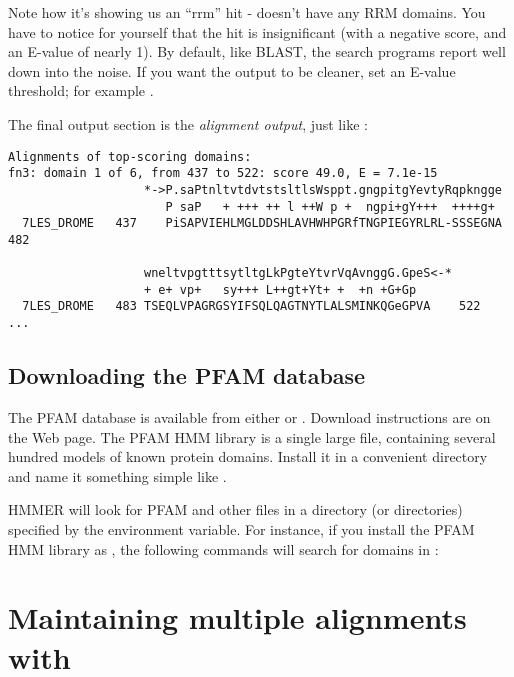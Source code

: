 Note how it's showing us an ``rrm'' hit -  doesn't
have any RRM domains. You have to notice for yourself that the hit is
insignificant (with a negative score, and an E-value of nearly 1).  By
default, like BLAST, the search programs report well down into the
noise. If you want the output to be cleaner, set an E-value threshold;
for example .

The final output section is the {\em alignment output}, just like :

{\small\begin{verbatim}
Alignments of top-scoring domains:
fn3: domain 1 of 6, from 437 to 522: score 49.0, E = 7.1e-15
                   *->P.saPtnltvtdvtstsltlsWsppt.gngpitgYevtyRqpkngge
                      P saP   + +++ ++ l ++W p +  ngpi+gY+++  ++++g+ 
  7LES_DROME   437    PiSAPVIEHLMGLDDSHLAVHWHPGRfTNGPIEGYRLRL-SSSEGNA 482  

                   wneltvpgtttsytltgLkPgteYtvrVqAvnggG.GpeS<-*
                   + e+ vp+   sy+++ L++gt+Yt+ +  +n +G+Gp     
  7LES_DROME   483 TSEQLVPAGRGSYIFSQLQAGTNYTLALSMINKQGeGPVA    522  
...
\end{verbatim}}

\subsection{Downloading the PFAM database}

The PFAM database is available from either  or \linebreak 
{}.
Download instructions are on the Web page. The PFAM HMM library is a
single large file, containing several hundred models of known protein
domains. Install it in a convenient directory and name it something
simple like .

HMMER will look for PFAM and other files in a directory (or
directories) specified by the  environment variable.  For
instance, if you install the PFAM HMM library as \linebreak {}, the following commands will search 
for domains in :

\vspace{1.5em}

\section{Maintaining multiple alignments with }

